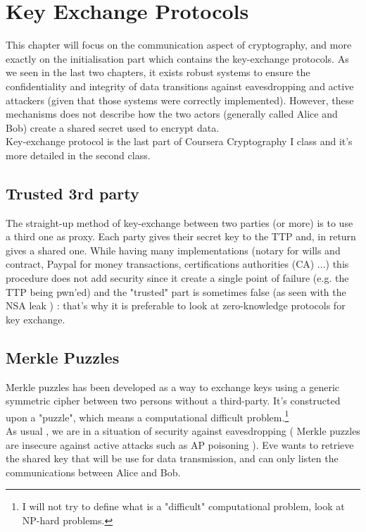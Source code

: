 \chapter{Key Exchange Protocols}

This chapter will focus on the communication aspect of cryptography, and more exactly on the initialisation part which contains the key-exchange protocols. As we seen in the last two chapters, it exists robust systems to ensure the confidentiality and integrity of data transitions against eavesdropping and active attackers (given that those systems were correctly implemented). However, these mechanisms does not describe how the two actors (generally called Alice and Bob) create a shared secret used to encrypt data. \\
Key-exchange protocol is the last part of Coursera Cryptography I class and it's more detailed in the second class.

\section{Trusted 3rd party}

The straight-up method of key-exchange between two parties (or more) is to use a third one as proxy. Each party gives their secret key to the TTP and, in return gives a shared one. While having many implementations (notary for wills and contract, Paypal for money transactions, certifications authorities (CA) ...) this procedure does not add security since it create a single point of failure (e.g. the TTP being pwn'ed) and the "trusted" part is sometimes false (as seen with the NSA leak ) : that's why it is preferable to look at zero-knowledge protocols for key exchange.


\section{Merkle Puzzles}
Merkle puzzles has been developed as a way to exchange keys using a generic symmetric cipher between two persons without a third-party. It's constructed upon a "puzzle", which means a computational difficult problem.\footnote{I will not try to define what is a "difficult" computational problem, look at NP-hard problems.} \\
As usual , we are in a situation of security against eavesdropping ( Merkle puzzles are insecure against active attacks such as AP poisoning ). Eve wants to retrieve the shared key that will be use for data transmission, and can only listen the communications between Alice and Bob. \\

